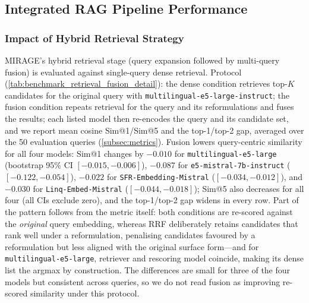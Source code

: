 \documentclass[11pt]{article}
\begin{document}
\begin{table}[t]
    \centering
    \caption{Clustering diagnostics of the vector space.}
    \label{tab:embed-cluster}
\end{table}

\subsection{Integrated RAG Pipeline Performance}
\label{subsec:exp_e2e}

\subsubsection{Impact of Hybrid Retrieval Strategy}
MIRAGE's hybrid retrieval stage (query expansion followed by multi-query fusion) is evaluated against single-query dense retrieval. Protocol (\cref{tab:benchmark_retrieval_fusion_detail}): the dense condition retrieves top-\(K\) candidates for the original query with \texttt{multilingual-e5-large-instruct}; the fusion condition repeats retrieval for the query and its reformulations and fuses the results; each listed model then re-encodes the query and its candidate set, and we report mean cosine Sim@1/Sim@5 and the top-1/top-2 gap, averaged over the 50 evaluation queries (\cref{subsec:metrics}). Fusion lowers query-centric similarity for all four models: Sim@1 changes by \(-0.010\) for \texttt{multilingual-e5-large} (bootstrap 95\% CI \([-0.015,-0.006]\)), \(-0.087\) for \texttt{e5-mistral-7b-instruct} (\([-0.122,-0.054]\)), \(-0.022\) for \texttt{SFR-Embedding-Mistral} (\([-0.034,-0.012]\)), and \(-0.030\) for \texttt{Linq-Embed-Mistral} (\([-0.044,-0.018]\)); Sim@5 also decreases for all four (all CIs exclude zero), and the top-1/top-2 gap widens in every row. Part of the pattern follows from the metric itself: both conditions are re-scored against the \emph{original} query embedding, whereas RRF deliberately retains candidates that rank well under a reformulation, penalising candidates favoured by a reformulation but less aligned with the original surface form---and for \texttt{multilingual-e5-large}, retriever and rescoring model coincide, making its dense list the argmax by construction. The differences are small for three of the four models but consistent across queries, so we do not read fusion as improving re-scored similarity under this protocol.
\end{document}
